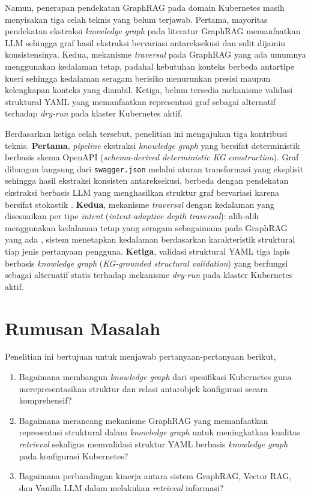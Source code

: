 Namun, penerapan pendekatan GraphRAG pada domain Kubernetes masih menyisakan tiga celah teknis yang belum terjawab. Pertama, mayoritas pendekatan ekstraksi \textit{knowledge graph} pada literatur GraphRAG memanfaatkan LLM sehingga graf hasil ekstraksi bervariasi antareksekusi dan sulit dijamin konsistensinya. Kedua, mekanisme \textit{traversal} pada GraphRAG yang ada umumnya menggunakan kedalaman tetap, padahal kebutuhan konteks berbeda antartipe kueri sehingga kedalaman seragam berisiko menurunkan presisi maupun kelengkapan konteks yang diambil. Ketiga, belum tersedia mekanisme validasi struktural YAML yang memanfaatkan representasi graf sebagai alternatif terhadap \textit{dry-run} pada klaster Kubernetes aktif.

Berdasarkan ketiga celah tersebut, penelitian ini mengajukan tiga kontribusi teknis. \textbf{Pertama}, \textit{pipeline} ekstraksi \textit{knowledge graph} yang bersifat deterministik berbasis skema OpenAPI (\textit{schema-derived deterministic KG construction}). Graf dibangun langsung dari \texttt{swagger.json} melalui aturan transformasi yang eksplisit sehingga hasil ekstraksi konsisten antareksekusi, berbeda dengan pendekatan ekstraksi berbasis LLM yang menghasilkan struktur graf bervariasi karena bersifat stokastik \parencite{pan2024unifying, wan2025empowering}. \textbf{Kedua}, mekanisme \textit{traversal} dengan kedalaman yang disesuaikan per tipe \textit{intent} (\textit{intent-adaptive depth traversal}): alih-alih menggunakan kedalaman tetap yang seragam sebagaimana pada GraphRAG yang ada \parencite{wan2025empowering}, sistem menetapkan kedalaman berdasarkan karakteristik struktural tiap jenis pertanyaan pengguna. \textbf{Ketiga}, validasi struktural YAML tiga lapis berbasis \textit{knowledge graph} (\textit{KG-grounded structural validation}) yang berfungsi sebagai alternatif statis terhadap mekanisme \textit{dry-run} pada klaster Kubernetes aktif.

\section{Rumusan Masalah}
Penelitian ini bertujuan untuk menjawab pertanyaan-pertanyaan berikut,
\begin{enumerate}
    \item Bagaimana membangun \textit{knowledge graph} dari spesifikasi Kubernetes guna merepresentasikan struktur dan relasi antarobjek konfigurasi secara komprehensif?
    
    \item Bagaimana merancang mekanisme GraphRAG yang memanfaatkan representasi struktural dalam \textit{knowledge graph} untuk meningkatkan kualitas \textit{retrieval} sekaligus memvalidasi struktur YAML berbasis \textit{knowledge graph} pada konfigurasi Kubernetes?

    \item Bagaimana perbandingan kinerja antara sistem GraphRAG, Vector RAG, dan Vanilla LLM dalam melakukan \textit{retrieval} informasi?
\end{enumerate}

